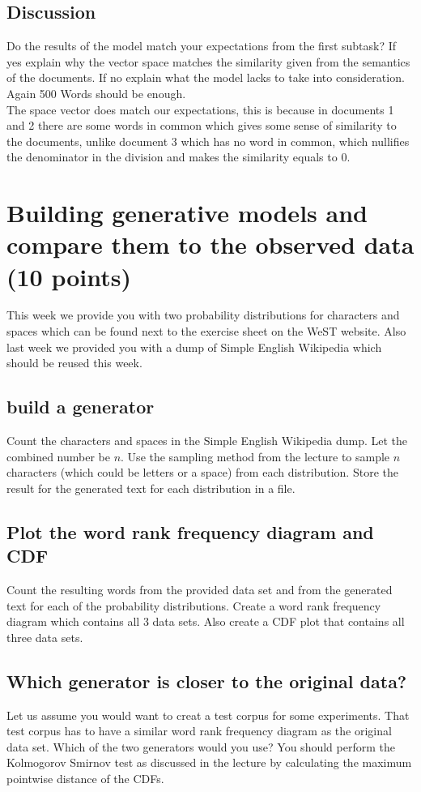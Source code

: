 \documentclass{WeSTassignment}
\begin{document}
\subsection{Discussion}
Do the results of the model match your expectations from the first subtask? If yes explain why the vector space matches the similarity given from the semantics of the documents. If no explain what the model lacks to take into consideration. Again 500 Words should be enough. 
\\ The space vector does match our expectations, this is because in documents 1 and 2 there are some words in common which gives some sense of similarity to the documents, unlike document 3 which has no word in common, which nullifies the denominator in the division and makes the similarity equals to 0.



\section{Building generative models and compare them to the observed data (10 points)}
This week we provide you with two probability distributions for characters and spaces which can be found next to the exercise sheet on the WeST website. Also last week we provided you with a dump of Simple English Wikipedia which should be reused this week.

\subsection{build a generator}
Count the characters and spaces in the Simple English Wikipedia dump. Let the combined number be $n$. 
Use the sampling method from the lecture to sample $n$ characters (which could be letters or a space) from each distribution.
Store the result for the generated text for each distribution in a file.

\subsection{Plot the word rank frequency diagram and CDF}
Count the resulting words from the provided data set and from the generated text for each of the probability distributions. 
Create a word rank frequency diagram which contains all 3 data sets. 
Also create a CDF plot that contains all three data sets. 

\subsection{Which generator is closer to the original data?}
Let us assume you would want to creat a test corpus for some experiments. That test corpus has to have a similar word rank frequency diagram as the original data set. Which of the two generators would you use? You should perform the Kolmogorov Smirnov test as discussed in the lecture by calculating the maximum pointwise distance of the CDFs. \\
\end{document}
